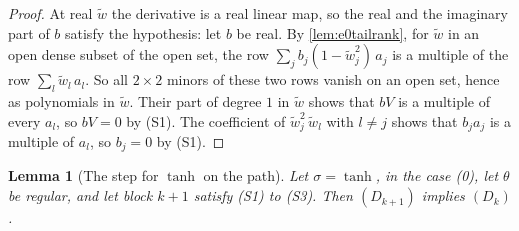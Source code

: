 \documentclass[10pt]{article}
\newtheorem{lemma}[theorem]{Lemma}
\theoremstyle{definition}
\theoremstyle{remark}
\begin{document}
\begin{proof}
At real $\tilde w$ the derivative is a real linear map, so the real and the imaginary part of $b$ satisfy the hypothesis: let $b$ be real. By \cref{lem:e0tailrank}, for $\tilde w$ in an open dense subset of the open set, the row $\sum_j b_j(1 - \tilde w_j^2)\,a_j$ is a multiple of the row $\sum_l\tilde w_l\,a_l$. So all $2\times2$ minors of these two rows vanish on an open set, hence as polynomials in $\tilde w$. Their part of degree $1$ in $\tilde w$ shows that $bV$ is a multiple of every $a_l$, so $bV = 0$ by (S1). The coefficient of $\tilde w_j^2\,\tilde w_l$ with $l \neq j$ shows that $b_ja_j$ is a multiple of $a_l$, so $b_j = 0$ by (S1).
\end{proof}

\begin{lemma}[The step for $\tanh$ on the path]\label{lem:e0steptanh}
Let $\sigma = \tanh$, in the case (0), let $\theta$ be regular, and let block $k+1$ satisfy (S1) to (S3). Then $(D_{k+1})$ implies $(D_k)$.
\end{lemma}
\end{document}
